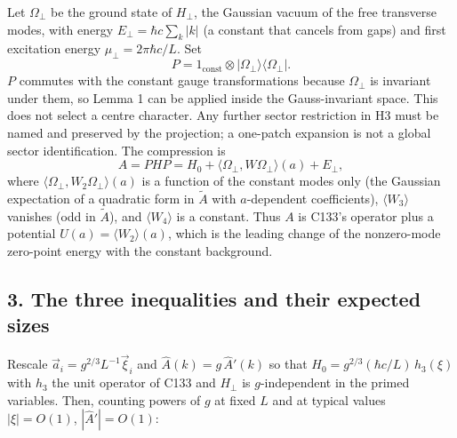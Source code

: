 \documentclass[11pt,a4paper]{article}
\begin{document}
Let \(\Omega_\perp\) be the ground state of \(H_\perp\), the Gaussian
vacuum of the free transverse modes, with energy
\(E_\perp=\hbar c\sum_k|k|\) (a constant that cancels from gaps) and
first excitation energy \(\mu_\perp=2\pi\hbar c/L\). Set
\[P=1_{\text{const}}\otimes|\Omega_\perp\rangle\langle\Omega_\perp| .\]
\(P\) commutes with the constant gauge transformations because
\(\Omega_\perp\) is invariant under them, so Lemma 1 can be applied
inside the Gauss-invariant space. This does not select a centre
character. Any further sector restriction in H3 must be named and
preserved by the projection; a one-patch expansion is not a global
sector identification. The compression is
\[A=PHP=H_0+\langle\Omega_\perp,W\Omega_\perp\rangle(a)+E_\perp,\] where
\(\langle\Omega_\perp,W_2\Omega_\perp\rangle(a)\) is a function of the
constant modes only (the Gaussian expectation of a quadratic form in
\(\tilde A\) with \(a\)-dependent coefficients), \(\langle W_3\rangle\)
vanishes (odd in \(\tilde A\)), and \(\langle W_4\rangle\) is a
constant. Thus \(A\) is C133's operator plus a potential
\(U(a)=\langle W_2\rangle(a)\), which is the leading change of the
nonzero-mode zero-point energy with the constant background.

\hypertarget{the-three-inequalities-and-their-expected-sizes}{%
\subsection{3. The three inequalities and their expected
sizes}\label{the-three-inequalities-and-their-expected-sizes}}

Rescale \(\vec a_i=g^{2/3}L^{-1}\vec\xi_i\) and
\(\hat A(k)=g\,\hat A'(k)\) so that \(H_0=g^{2/3}(\hbar c/L)\,h_3(\xi)\)
with \(h_3\) the unit operator of C133 and \(H_\perp\) is
\(g\)-independent in the primed variables. Then, counting powers of
\(g\) at fixed \(L\) and at typical values \(|\xi|=O(1)\),
\(|\hat A'|=O(1)\):
\end{document}
